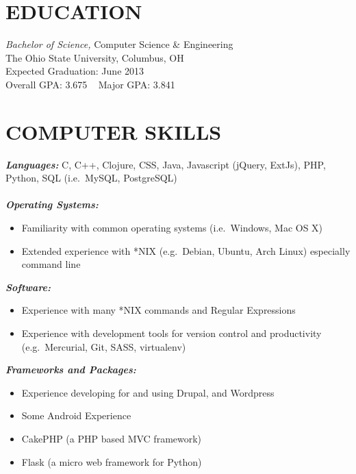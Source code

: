 \documentclass[line,margin=.2,letterpaper]{resume}
\begin{document}
\fancyhead{}
\fancyfoot{}
\renewcommand{\headrulewidth}{0pt}
\address{2092 Middlesex road, Columbus, OH 43220}
\address{\href{mailto:ryan@ryanmcg.com}{ryan@ryanmcg.com} -- (614) 678-4408}
\address{GitHub: \href{https://github.com/RyanMcG}{https://github.com/RyanMcG}}
\begin{resume}
\vspace{-.45in}
 
\section{\uppercase{Education}} {\sl Bachelor of Science,} \/Computer Science \&
Engineering \\
		The Ohio State University, Columbus, OH \\
        Expected Graduation: June 2013 \\
		Overall GPA: 3.675 ~ Major GPA: 3.841 \\
\vspace{-.15in}
 
\section{\uppercase{Computer Skills}}
	{\sl\textbf{Languages:}}
        \/C, C++, Clojure, CSS, Java, Javascript (jQuery, ExtJs), PHP, Python,
        SQL (i.e.~MySQL, PostgreSQL) \\ \\
	{\sl\textbf{Operating Systems: }} \hfill 
	    \begin{itemize}
		\item Familiarity with common operating systems (i.e.~Windows, Mac OS X)
        \item Extended experience with *NIX (e.g.~Debian, Ubuntu, Arch Linux)
              especially command line
        \end{itemize}
	{\sl\textbf{Software:}} \hfill 
	    \begin{itemize}
		\item Experience with many *NIX commands and Regular Expressions
		\item Experience with development tools for version control and
              productivity (e.g.~Mercurial, Git, SASS, virtualenv)
	    \end{itemize}
	{\sl\textbf{Frameworks and Packages:}} \hfill 
	    \begin{itemize}
		\item Experience developing for and using Drupal, and Wordpress
		\item Some Android Experience
        \item CakePHP (a PHP based MVC framework)
        \item Flask (a micro web framework for Python)
	    \end{itemize}



\end{resume}
\end{document}
